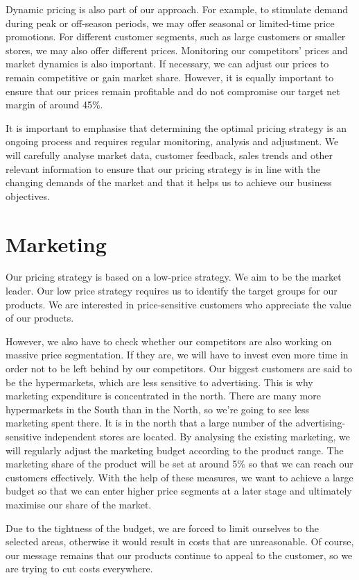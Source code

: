 \documentclass{article}
\begin{document}
	Dynamic pricing is also part of our approach. For example, to stimulate demand during peak or off-season periods, we may offer seasonal or limited-time price promotions. For different customer segments, such as large customers or smaller stores, we may also offer different prices.
	Monitoring our competitors' prices and market dynamics is also important. If necessary, we can adjust our prices to remain competitive or gain market share. However, it is equally important to ensure that our prices remain profitable and do not compromise our target net margin of around 45\%.
	
	It is important to emphasise that determining the optimal pricing strategy is an ongoing process and requires regular monitoring, analysis and adjustment. We will carefully analyse market data, customer feedback, sales trends and other relevant information to ensure that our pricing strategy is in line with the changing demands of the market and that it helps us to achieve our business objectives.
	
	\section*{Marketing}
	Our pricing strategy is based on a low-price strategy. We aim to be the market leader. Our low price strategy requires us to identify the target groups for our products. We are interested in price-sensitive customers who appreciate the value of our products. 
	
	However, we also have to check whether our competitors are also working on massive price segmentation. If they are, we will have to invest even more time in order not to be left behind by our competitors. Our biggest customers are said to be the hypermarkets, which are less sensitive to advertising. This is why marketing expenditure is concentrated in the north. There are many more hypermarkets in the South than in the North, so we're going to see less marketing spent there. It is in the north that a large number of the advertising-sensitive independent stores are located. By analysing the existing marketing, we will regularly adjust the marketing budget according to the product range. The marketing share of the product will be set at around 5\% so that we can reach our customers effectively. With the help of these measures, we want to achieve a large budget so that we can enter higher price segments at a later stage and ultimately maximise our share of the market. 
	
	Due to the tightness of the budget, we are forced to limit ourselves to the selected areas, otherwise it would result in costs that are unreasonable. Of course, our message remains that our products continue to appeal to the customer, so we are trying to cut costs everywhere.
	
\end{document}

